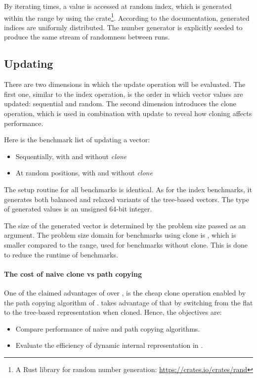 By iterating \n{} times, a value is accessed at random index, which is generated within the \range{[0, N)} range by using the  crate\footnote{A Rust library for random number generation: \url{https://crates.io/crates/rand}}. According to the  documentation, generated indices are uniformly distributed. The number generator is explicitly seeded to produce the same stream of randomness between runs.

\subsection{Updating}
There are two dimensions in which the update operation will be evaluated. The first one, similar to the index operation, is the order in which vector values are updated: sequential and random. The second dimension introduces the clone operation, which is used in combination with update to reveal how cloning affects performance.

Here is the benchmark list of updating a vector:
\begin{itemize}
    \item Sequentially, with and without \emph{clone}
    \item At random positions, with and without \emph{clone}
\end{itemize}

The setup routine for all benchmarks is identical. As for the index benchmarks, it generates both balanced and relaxed variants of the tree-based vectors. The type of generated values is an unsigned 64-bit integer.

The size of the generated vector is determined by the problem size passed as an argument. The problem size domain for benchmarks using clone is \range{[10, \kilo{20}]}, which is smaller compared to the \range{[10, \kilo{100}]} range, used for benchmarks without clone. This is done to reduce the runtime of benchmarks.

\paragraph{The cost of naive clone vs path copying}
One of the claimed advantages of \rbvec{} over \stdvec{}, is the cheap clone operation enabled by the path copying algorithm of \rbtree{}. \pvec{} takes advantage of that by switching from the flat to the tree-based representation when cloned. Hence, the objectives are:
\begin{itemize}
    \item Compare performance of naive and path copying algorithms.
    \item Evaluate the efficiency of dynamic internal representation in \pvec{}.
\end{itemize}

